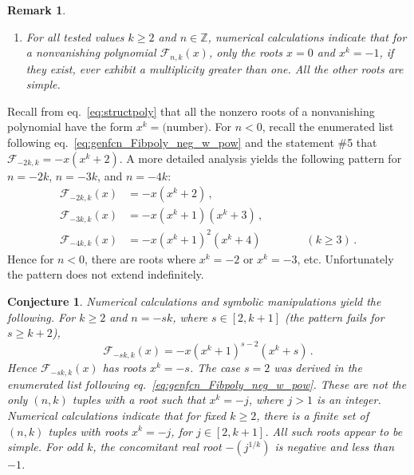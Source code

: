 \documentclass[review]{elsarticle}
\theoremstyle{plain}
\newtheorem{remark}[theorem]{Remark}
\newtheorem{conjecture}[theorem]{Conjecture}
\begin{document}
\begin{remark}
\begin{enumerate}
\item
For all tested values $k\ge2$ and $n\in\mathbb{Z}$,
numerical calculations indicate that for a nonvanishing polynomial $\mathcal{F}_{n,k}(x)$,
only the roots $x=0$ and $x^k = -1$, if they exist, ever exhibit a multiplicity greater than one.
All the other roots are simple.
\end{enumerate}
\end{remark}

Recall from eq.~\eqref{eq:structpoly} that all the nonzero roots of a nonvanishing polynomial have the form $x^k = \textrm{(number)}$.
For $n<0$, recall the enumerated list following eq.~\eqref{eq:genfcn_Fibpoly_neg_w_pow}
and the statement \#5 that $\mathcal{F}_{-2k,k} = -x(x^k+2)$.
A more detailed analysis yields the following pattern for $n=-2k$, $n=-3k$, and $n=-4k$:
\begin{equation}  
\begin{split}
  \mathcal{F}_{-2k,k}(x) &= -x(x^k+2) \,,
  \\
  \mathcal{F}_{-3k,k}(x) &= -x(x^k+1)(x^k+3) \,,
  \\
  \mathcal{F}_{-4k,k}(x) &= -x(x^k+1)^2(x^k+4) \qquad\qquad (k\ge3) \,.
\end{split}
\end{equation}
Hence for $n<0$, there are roots where $x^k = -2$ or $x^k = -3$, etc.
Unfortunately the pattern does not extend indefinitely.

\begin{conjecture}\label{conj:xks}
Numerical calculations and symbolic manipulations yield the following.
For $k\ge2$ and $n = -sk$, where $s\in[2,k+1]$ (the pattern fails for $s\ge k+2$),
\begin{equation}  
  \mathcal{F}_{-sk,k}(x) = -x(x^k+1)^{s-2}(x^k+s) \,.
\end{equation}
Hence $\mathcal{F}_{-sk,k}(x)$ has roots $x^k=-s$.
The case $s=2$ was derived in the enumerated list following eq.~\eqref{eq:genfcn_Fibpoly_neg_w_pow}.
These are not the only $(n,k)$ tuples with a root such that $x^k=-j$, where $j>1$ is an integer.
Numerical calculations indicate that for fixed $k\ge2$, there is a finite set of $(n,k)$ tuples with roots $x^k=-j$, for $j\in[2,k+1]$.
All such roots appear to be simple.
For odd $k$, the concomitant real root $-(j^{1/k})$ is negative and less than $-1$.
\end{conjecture}
\end{document}
